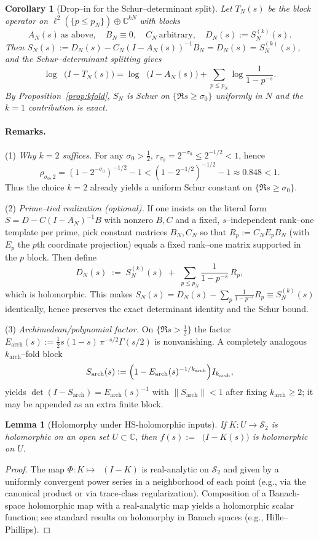 \documentclass[11pt]{article}
\newtheorem{lemma}[theorem]{Lemma}
\newtheorem{corollary}[theorem]{Corollary}
\theoremstyle{remark}
\newcommand{\C}{\mathbb{C}}
\newcommand{\HS}{\mathcal{S}_2}
\DeclareMathOperator{\dettwo}{det_2}
\begin{document}
\begin{corollary}[Drop--in for the Schur--determinant split]
\label{cor:dropin}
Let $T_N(s)$ be the block operator on $\ell^2(\{p\le p_N\})\oplus\C^{kN}$ with blocks
\[
 A_N(s)\ \text{as above},\quad B_N\equiv 0,\quad C_N\ \text{arbitrary},\quad D_N(s):=S_{N}^{(k)}(s).
\]
Then $S_N(s):=D_N(s)-C_N(I-A_N(s))^{-1}B_N=D_N(s)=S_{N}^{(k)}(s)$, and the Schur--determinant splitting gives
\[
 \log\dettwo\bigl(I-T_N(s)\bigl)=\log\dettwo\bigl(I-A_N(s)\bigr)+\sum_{p\le p_N}\log\!\frac{1}{1-p^{-s}}.
\]
By Proposition~\ref{prop:kfold}, $S_N$ is Schur on $\{\Re s\ge \sigma_0\}$ uniformly in $N$ and the $k=1$ contribution is exact.
\end{corollary}

\paragraph{Remarks.}
(1) \emph{Why $k=2$ suffices.} For any $\sigma_0>\tfrac12$, $r_{\sigma_0}=2^{-\sigma_0}\le 2^{-1/2}<1$, hence
\[
 \rho_{\sigma_0,2}=(1-2^{-\sigma_0})^{-1/2}-1<(1-2^{-1/2})^{-1/2}-1\approx 0.848<1.
\]
Thus the choice $k=2$ already yields a uniform Schur constant on $\{\Re s\ge \sigma_0\}$.

(2) \emph{Prime--tied realization (optional).} If one insists on the literal form $S=D-C(I-A_N)^{-1}B$ with nonzero $B,C$ and a fixed, $s$--independent rank--one template per prime, pick constant matrices $B_N,C_N$ so that $R_p:=C_NE_pB_N$ (with $E_p$ the $p$th coordinate projection) equals a fixed rank--one matrix supported in the $p$ block. Then define
\[
 D_N(s)\;:=\;S_{N}^{(k)}(s)\;+\;\sum_{p\le p_N}\frac{1}{1-p^{-s}}\,R_p,
\]
which is holomorphic. This makes $S_N(s)=D_N(s)-\sum_p \frac{1}{1-p^{-s}}R_p\equiv S_{N}^{(k)}(s)$ identically, hence preserves the exact determinant identity and the Schur bound.

(3) \emph{Archimedean/polynomial factor.} On $\{\Re s>\tfrac12\}$ the factor $E_{\mathrm{arch}}(s):=\tfrac12 s(1-s)\,\pi^{-s/2}\Gamma(s/2)$ is nonvanishing. A completely analogous $k_{\mathrm{arch}}$--fold block
\[
 S_{\mathrm{arch}}(s):=\Bigl(1-E_{\mathrm{arch}}(s)^{-1/k_{\mathrm{arch}}}\Bigr)I_{k_{\mathrm{arch}}},
\]
yields $\det(I-S_{\mathrm{arch}})=E_{\mathrm{arch}}(s)^{-1}$ with $\|S_{\mathrm{arch}}\|<1$ after fixing $k_{\mathrm{arch}}\ge 2$; it may be appended as an extra finite block.

\begin{lemma}[Holomorphy under HS-holomorphic inputs]\label{lem:holomorphy}
If \(K:U\to\HS\) is holomorphic on an open set \(U\subset\C\), then \(f(s):=\dettwo\big(I-K(s)\big)\) is holomorphic on \(U\).
\end{lemma}
\begin{proof}
The map \(\Phi:K\mapsto \dettwo(I-K)\) is real-analytic on \(\HS\) and given by a uniformly convergent power series in a neighborhood of each point (e.g., via the canonical product or via trace-class regularization). Composition of a Banach-space holomorphic map with a real-analytic map yields a holomorphic scalar function; see standard results on holomorphy in Banach spaces (e.g., Hille--Phillips).
\end{proof}
\end{document}
